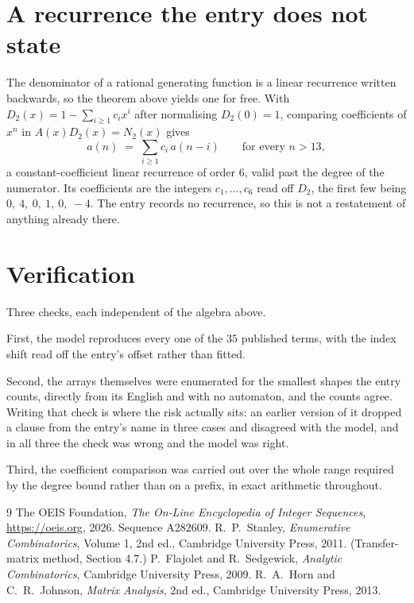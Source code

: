 \documentclass[11pt,a4paper]{article}
\theoremstyle{plain}
\theoremstyle{definition}
\begin{document}
\section{A recurrence the entry does not state}

The denominator of a rational generating function is a linear recurrence written backwards, so
the theorem above yields one for free. With $D_2(x)=1-\sum_{i\ge1}c_ix^i$ after normalising
$D_2(0)=1$, comparing coefficients of $x^n$ in $A(x)D_2(x)=N_2(x)$ gives
\[
a(n)\;=\;\sum_{i\ge1}c_i\,a(n-i)\qquad\text{for every }n>13,
\]
a constant-coefficient linear recurrence of order $6$, valid past the degree of the
numerator. Its coefficients are the integers $c_1,\dots,c_{6}$ read off $D_2$, the first few being $0,\ 4,\ 0,\ 1,\ 0,\ -4$. The entry records no recurrence, so this is not a restatement of anything
already there.

\section{Verification}

Three checks, each independent of the algebra above.

First, the model reproduces every one of the $35$ published terms, with the index shift
read off the entry's offset rather than fitted.

Second, the arrays themselves were enumerated for the smallest shapes the entry counts,
directly from its English and with no automaton, and the counts agree. Writing that check is
where the risk actually sits: an earlier version of it dropped a clause from the entry's name
in three cases and disagreed with the model, and in all three the check was wrong and the model
was right.

Third, the coefficient comparison was carried out over the whole range required by the degree
bound rather than on a prefix, in exact arithmetic throughout.

\begin{thebibliography}{9}
 The OEIS Foundation, \emph{The On-Line Encyclopedia of Integer
Sequences}, \url{https://oeis.org}, 2026. Sequence A282609.
 R.~P.~Stanley, \emph{Enumerative Combinatorics}, Volume 1, 2nd ed.,
Cambridge University Press, 2011. (Transfer-matrix method, Section 4.7.)
 P.~Flajolet and R.~Sedgewick, \emph{Analytic Combinatorics}, Cambridge
University Press, 2009.
 R.~A.~Horn and C.~R.~Johnson, \emph{Matrix Analysis}, 2nd ed., Cambridge
University Press, 2013.
\end{thebibliography}
\end{document}
